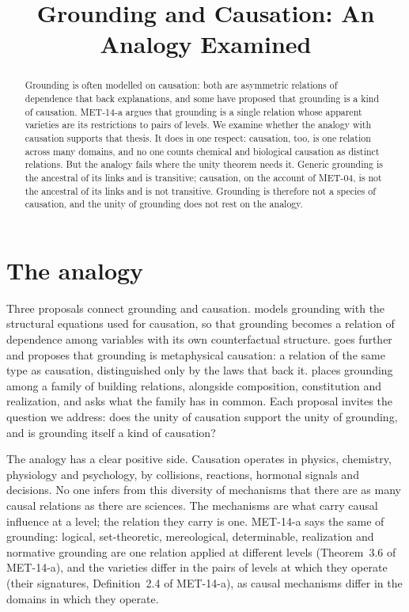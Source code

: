 \documentclass{situationist-preprint}
\title{Grounding and Causation: An Analogy Examined}
\begin{document}
\maketitle

\begin{abstract}
Grounding is often modelled on causation: both are asymmetric relations of dependence that back explanations, and some have proposed that grounding is a kind of causation. MET-14-a argues that grounding is a single relation whose apparent varieties are its restrictions to pairs of levels. We examine whether the analogy with causation supports that thesis. It does in one respect: causation, too, is one relation across many domains, and no one counts chemical and biological causation as distinct relations. But the analogy fails where the unity theorem needs it. Generic grounding is the ancestral of its links and is transitive; causation, on the account of MET-04, is not the ancestral of its links and is not transitive. Grounding is therefore not a species of causation, and the unity of grounding does not rest on the analogy.
\end{abstract}

\section{The analogy}

Three proposals connect grounding and causation. \citet{Schaffer2016} models grounding with the structural equations used for causation, so that grounding becomes a relation of dependence among variables with its own counterfactual structure. \citet{Wilson2018} goes further and proposes that grounding is metaphysical causation: a relation of the same type as causation, distinguished only by the laws that back it. \citet{Bennett2017} places grounding among a family of building relations, alongside composition, constitution and realization, and asks what the family has in common. Each proposal invites the question we address: does the unity of causation support the unity of grounding, and is grounding itself a kind of causation?

The analogy has a clear positive side. Causation operates in physics, chemistry, physiology and psychology, by collisions, reactions, hormonal signals and decisions. No one infers from this diversity of mechanisms that there are as many causal relations as there are sciences. The mechanisms are what carry causal influence at a level; the relation they carry is one. MET-14-a says the same of grounding: logical, set-theoretic, mereological, determinable, realization and normative grounding are one relation applied at different levels (Theorem~3.6 of MET-14-a), and the varieties differ in the pairs of levels at which they operate (their signatures, Definition~2.4 of MET-14-a), as causal mechanisms differ in the domains in which they operate.
\end{document}
